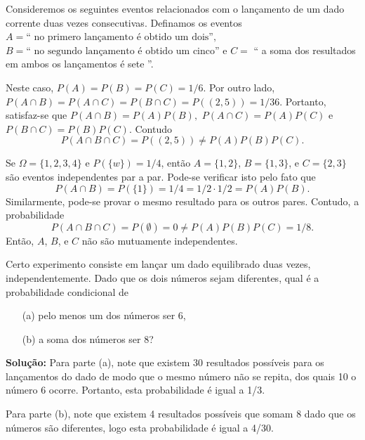 \begin{frame}
\begin{exem}
	Consideremos os seguintes eventos relacionados com o lançamento de um dado corrente duas vezes consecutivas. Definamos os eventos  
	$A = \text{`` no primero lançamento é obtido um dois''}, $ $B =\text{`` no segundo lançamento é obtido um cinco''}$ e 
	$C =$ {`` a soma dos resultados em ambos os lançamentos é sete ''}.
	
	Neste caso, $P(A)=P(B)=P(C)=1/6$. Por outro lado, $P(A\cap B)=P(A\cap C)=P(B\cap C)=P((2,5))=1/36$. Portanto, satisfaz-se que 
	$P(A\cap B)=P(A)P(B),$ $P(A\cap C)=P(A)P(C)$ e $P(B\cap C)=P(B)P(C).$ Contudo $$P(A\cap B\cap C)=P((2,5))\neq P(A)P(B)P(C).$$
\end{exem}

\begin{exem}
Se $\Omega=\{1,2,3,4\}$ e $P(\{w\})=1/4$, então $A=\{1,2\}$,
$B=\{1,3\}$, e $C=\{2,3\}$ são eventos independentes par a par.
Pode-se verificar isto pelo fato que
$$P(A\cap B)=P(\{1\})={1}/{4}={1}/{2}\cdot{1}/{2}=P(A)P(B).$$
Similarmente, pode-se provar o mesmo resultado para os outros pares.
Contudo, a probabilidade
%
$$P(A\cap B\cap C)=P(\emptyset)=0\ne P(A)P(B)P(C)={1}/{8}.$$
Então, $A$, $B$, e $C$ não são mutuamente independentes.
\end{exem}
\end{frame}
\begin{frame}
\begin{exem}
	Certo experimento consiste em lançar um dado equilibrado duas vezes, independentemente. Dado que os dois números sejam diferentes, qual é a probabilidade condicional de
	\begin{enumerate}
		\item[(a)] pelo menos um dos números ser 6,
		\item[(b)] a soma dos números ser 8?
	\end{enumerate}
\end{exem}	
	{\bf Solução:} Para parte (a), note que existem 30 resultados possíveis para os lançamentos do dado de modo que o mesmo número não se repita, dos quais 10 o número 6 ocorre. Portanto, esta probabilidade é igual a 1/3.
	
	Para parte (b), note que existem 4 resultados possíveis que somam 8 dado que os números são diferentes, logo esta probabilidade é igual a 4/30.


\end{frame}


